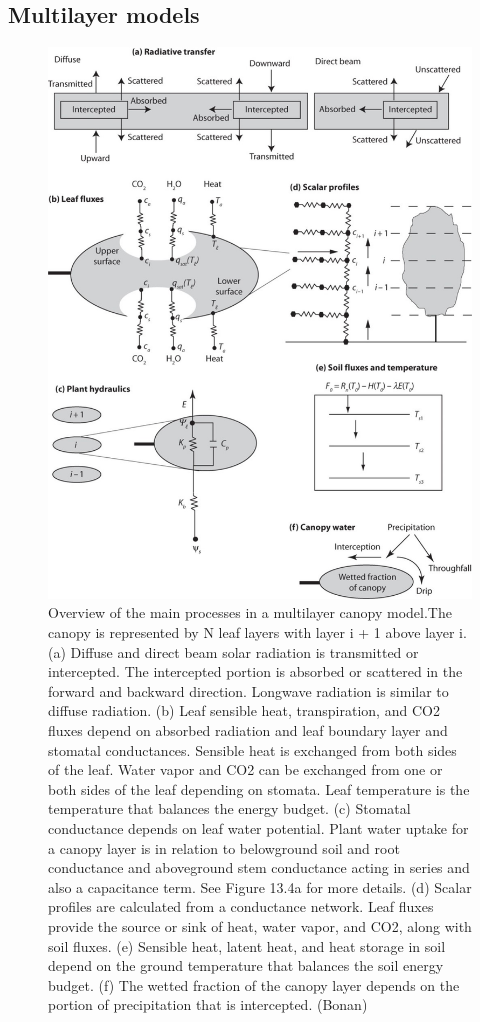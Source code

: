 \documentclass[
  oneside]{book}
\begin{document}
\hypertarget{multilayer-models}{%
\subsection{Multilayer models}\label{multilayer-models}}

\begin{figure}

{\centering \includegraphics[width=0.8\linewidth]{figures/chap3/f325_multilayer_process} 

}

\caption{Overview of the main processes in a multilayer canopy model.The canopy is represented by N leaf layers with layer i + 1 above layer i. (a) Diffuse and direct beam solar radiation is transmitted or intercepted. The intercepted portion is absorbed or scattered in the forward and backward direction. Longwave radiation is similar to diffuse radiation. (b) Leaf sensible heat, transpiration, and CO2 fluxes depend on absorbed radiation and leaf boundary layer and stomatal conductances. Sensible heat is exchanged from both sides of the leaf. Water vapor and CO2 can be exchanged from one or both sides of the leaf depending on stomata. Leaf temperature is the temperature that balances the energy budget. (c) Stomatal conductance depends on leaf water potential. Plant water uptake for a canopy layer is in relation to belowground soil and root conductance and aboveground stem conductance acting in series and also a capacitance term. See Figure 13.4a for more details. (d) Scalar profiles are calculated from a conductance network. Leaf fluxes provide the source or sink of heat, water vapor, and CO2, along with soil fluxes. (e) Sensible heat, latent heat, and heat storage in soil depend on the ground temperature that balances the soil energy budget. (f) The wetted fraction of the canopy layer depends on the portion of precipitation that is intercepted. (Bonan)}\label{fig:f325}
\end{figure}
\end{document}
